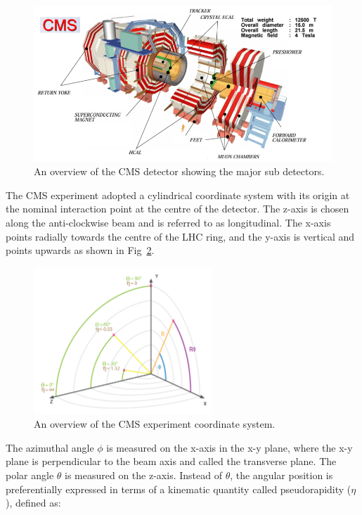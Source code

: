 \begin{figure}[h!]
\includegraphics[width=1.05\textwidth]{fig/lhc/CMS_exper.png}
\caption{\label{fig:CMS_exper} An overview of the CMS detector showing the major sub detectors.}
\end{figure}
The CMS experiment adopted a cylindrical coordinate system with its origin at the nominal interaction point at the centre of the detector. The z-axis is chosen along the anti-clockwise beam and is referred to as longitudinal. The x-axis points radially towards the centre of the LHC ring, and the y-axis is vertical and points upwards as shown in Fig~\ref{fig:CMS_coordinates}. 
\begin{figure}[h!]
\centering
\includegraphics[width=0.6\textwidth]{fig/lhc/img_cms_coordinates.png}
\caption{\label{fig:CMS_coordinates} An overview of the CMS experiment coordinate system.}
\end{figure}
The azimuthal angle $\phi$ is measured on the x-axis in the x-y plane, where the x-y plane is perpendicular to the beam axis and called the transverse plane. The polar angle $\theta$ is measured on the z-axis. Instead of $\theta$, the angular position is preferentially expressed in terms of a kinematic quantity called pseudorapidity ($\eta$), defined as:
